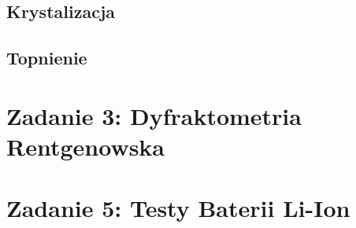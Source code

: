 \documentclass[a4paper,10pt]{article}
\begin{document}
\subsection{Krystalizacja}

\subsection{Topnienie}

\section{Zadanie 3: Dyfraktometria Rentgenowska}


\section{Zadanie 5: Testy Baterii Li-Ion}

 
\end{document}
